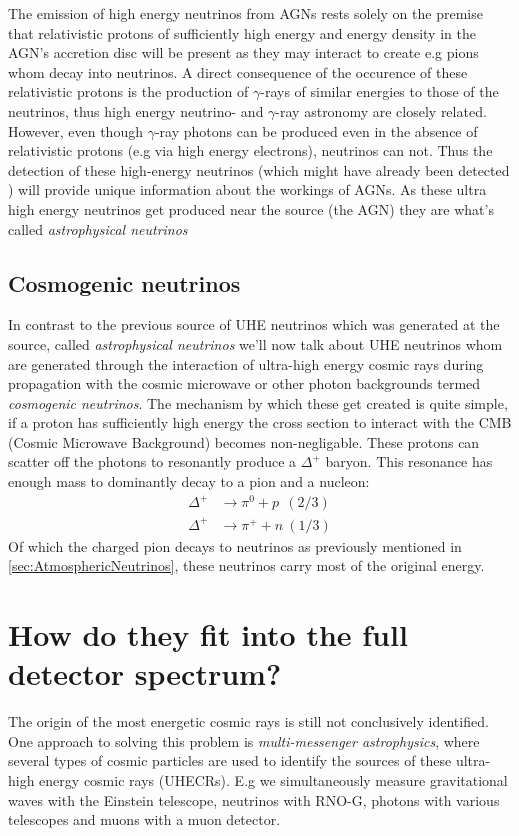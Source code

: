The emission of high energy neutrinos from AGNs rests solely on the premise
that relativistic protons of sufficiently high energy and energy density in the
AGN's accretion disc will be present \cite{NASANeutrinos} as they may interact
to create e.g pions whom decay into neutrinos. A direct consequence of the occurence of these
relativistic protons is the production of $\gamma$-rays of similar energies to
those of the neutrinos, thus high energy neutrino- and $\gamma$-ray astronomy are
closely related.  However, even though $\gamma$-ray photons can be produced
even in the absence of relativistic protons (e.g via high energy electrons),
neutrinos can not.  Thus the detection of these high-energy neutrinos (which
might have already been detected \cite{AGNNeutrino}) will provide unique
information about the workings of AGNs.
As these ultra high energy neutrinos get produced near the source (the AGN)
they are what's called \textit{astrophysical neutrinos}

\subsection{Cosmogenic neutrinos}
In contrast to the previous source of UHE neutrinos which was generated at the
source, called \textit{astrophysical neutrinos} we'll now talk about UHE
neutrinos whom are generated through the interaction of ultra-high energy
cosmic rays during propagation with the cosmic microwave or other photon
backgrounds termed \textit{cosmogenic neutrinos}.  The mechanism by which these
get created is quite simple, if a proton has sufficiently high energy the cross
section to interact with the CMB (Cosmic Microwave Background) becomes
non-negligable.  These protons can scatter off the photons to resonantly
produce a $\Delta^+$ baryon.  This resonance has enough mass to dominantly
decay to a pion and a nucleon:
\begin{align}
	\Delta^+ &\rightarrow \pi^0 + p \ \ (2/3)\\
	\Delta^+ &\rightarrow \pi^+ + n \ (1/3)
\end{align}
Of which the charged pion decays to neutrinos as previously mentioned in 
\ref{sec:AtmosphericNeutrinos}, these neutrinos carry most of the original energy.
\section{How do they fit into the full detector spectrum?}
The origin of the most energetic cosmic rays is still not conclusively
identified. One approach to solving this problem is \textit{multi-messenger
astrophysics}, where several types of cosmic particles are used to identify the
sources of these ultra-high energy cosmic rays (UHECRs). E.g we simultaneously
measure gravitational waves with the Einstein telescope, neutrinos with RNO-G,
photons with various telescopes and muons with a muon detector.
\newpage

